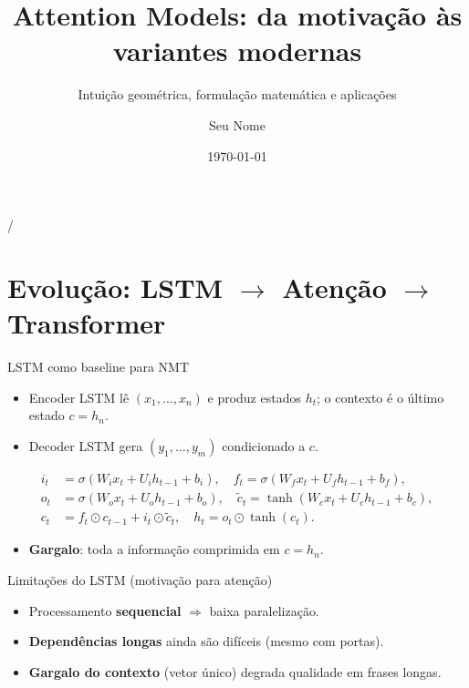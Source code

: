 \documentclass{beamer}
\title{Attention Models: da motivação às variantes modernas}
\subtitle{Intuição geométrica, formulação matemática e aplicações}
\author{Seu Nome}
\date{\today}
\begin{document}
\maketitle


/%

\section{Evolução: LSTM \texorpdfstring{$\rightarrow$}{->} Atenção \texorpdfstring{$\rightarrow$}{->} Transformer}

\begin{frame}{LSTM como baseline para NMT}
\begin{itemize}
  \item Encoder LSTM lê $(x_1,\dots,x_n)$ e produz estados $h_t$; o contexto é o último estado $c=h_n$.
  \item Decoder LSTM gera $(y_1,\dots,y_m)$ condicionado a $c$.
\end{itemize}
\[
\begin{aligned}
 i_t &= \sigma(W_i x_t + U_i h_{t-1} + b_i),\quad
 f_t = \sigma(W_f x_t + U_f h_{t-1} + b_f),\\
 o_t &= \sigma(W_o x_t + U_o h_{t-1} + b_o),\quad
 \tilde{c}_t = \tanh(W_c x_t + U_c h_{t-1} + b_c),\\
 c_t &= f_t \odot c_{t-1} + i_t \odot \tilde{c}_t,\quad
 h_t = o_t \odot \tanh(c_t).
\end{aligned}
\]
\begin{itemize}
  \item \textbf{Gargalo}: toda a informação comprimida em $c=h_n$.
\end{itemize}
\end{frame}

\begin{frame}{Limitações do LSTM (motivação para atenção)}
\begin{itemize}
  \item Processamento \textbf{sequencial} $\Rightarrow$ baixa paralelização.
  \item \textbf{Dependências longas} ainda são difíceis (mesmo com portas).
  \item \textbf{Gargalo do contexto} (vetor único) degrada qualidade em frases longas.
\end{itemize}
\end{frame}
\end{document}

